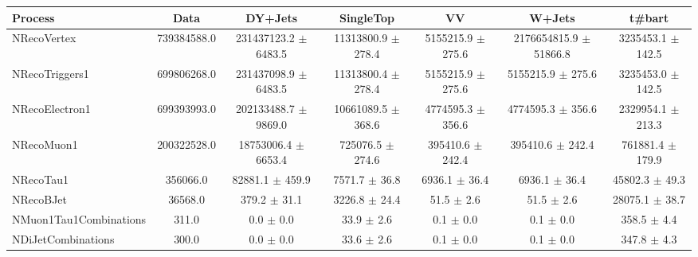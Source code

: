 \begin{tabular}{ | l | c | c | c | c | c | c | }
\hline
Process & Data & DY+Jets & SingleTop & VV & W+Jets & t#bar{t}\\ \hline
NRecoVertex & 739384588.0 & 231437123.2 $\pm$ 6483.5 & 11313800.9 $\pm$ 278.4 & 5155215.9 $\pm$ 275.6 &  2176654815.9 $\pm$ 51866.8 & 3235453.1 $\pm$ 142.5 \\ \hline
NRecoTriggers1 & 699806268.0 & 231437098.9 $\pm$ 6483.5 & 11313800.4 $\pm$ 278.4 & 5155215.9 $\pm$ 275.6 & 5155215.9 $\pm$ 275.6 & 3235453.0 $\pm$ 142.5 \\ \hline
NRecoElectron1 & 699393993.0 & 202133488.7 $\pm$ 9869.0 & 10661089.5 $\pm$ 368.6 & 4774595.3 $\pm$ 356.6 & 4774595.3 $\pm$ 356.6 & 2329954.1 $\pm$ 213.3 \\ \hline
NRecoMuon1 & 200322528.0 & 18753006.4 $\pm$ 6653.4 & 725076.5 $\pm$ 274.6 & 395410.6 $\pm$ 242.4 & 395410.6 $\pm$ 242.4 & 761881.4 $\pm$ 179.9 \\ \hline
NRecoTau1 & 356066.0 & 82881.1 $\pm$ 459.9 & 7571.7 $\pm$ 36.8 & 6936.1 $\pm$ 36.4 & 6936.1 $\pm$ 36.4 & 45802.3 $\pm$ 49.3 \\ \hline
NRecoBJet & 36568.0 & 379.2 $\pm$ 31.1 & 3226.8 $\pm$ 24.4 & 51.5 $\pm$ 2.6 & 51.5 $\pm$ 2.6 & 28075.1 $\pm$ 38.7 \\ \hline
NMuon1Tau1Combinations & 311.0 & 0.0 $\pm$ 0.0 & 33.9 $\pm$ 2.6 & 0.1 $\pm$ 0.0 & 0.1 $\pm$ 0.0 & 358.5 $\pm$ 4.4 \\ \hline
NDiJetCombinations & 300.0 & 0.0 $\pm$ 0.0 & 33.6 $\pm$ 2.6 & 0.1 $\pm$ 0.0 & 0.1 $\pm$ 0.0 & 347.8 $\pm$ 4.3 \\ \hline
\end{tabular}